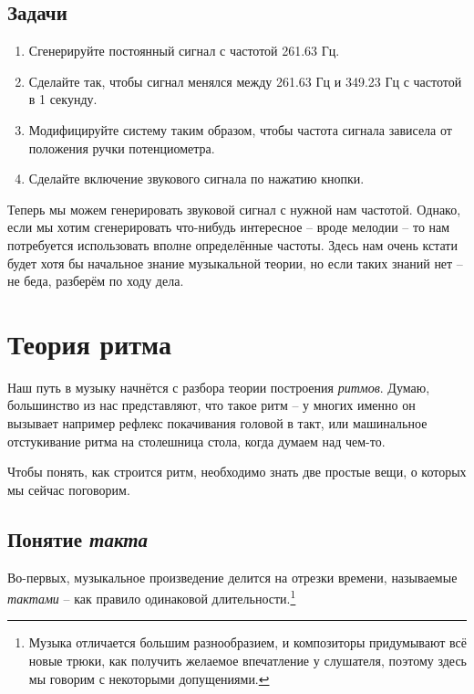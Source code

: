 \documentclass[a4paper,twoside]{book}
\begin{document}
\subsection{Задачи}
\begin{enumerate}
\item Сгенерируйте постоянный сигнал с частотой 261.63 Гц.
\item Сделайте так, чтобы сигнал менялся между 261.63 Гц и 349.23 Гц с частотой
  в 1 секунду. 
\item Модифицируйте систему таким образом, чтобы частота сигнала зависела от
  положения ручки потенциометра. 
\item Сделайте включение звукового сигнала по нажатию кнопки.
\end{enumerate}

Теперь мы можем генерировать звуковой сигнал с нужной нам частотой. Однако, если
мы хотим сгенерировать что-нибудь интересное -- вроде мелодии -- то нам
потребуется использовать вполне определённые частоты. Здесь нам очень кстати
будет хотя бы начальное знание музыкальной теории, но если таких знаний нет --
не беда, разберём по ходу дела.

\section{Теория ритма}

Наш путь в музыку начнётся с разбора теории построения \emph{ритмов}. Думаю,
большинство из нас представляют, что такое ритм -- у многих именно он вызывает
например рефлекс покачивания головой в такт, или машинальное отстукивание ритма
на столешница стола, когда думаем над чем-то.

Чтобы понять, как строится ритм, необходимо знать две простые вещи, о которых мы
сейчас поговорим.

\subsection{Понятие \emph{такта}}

Во-первых, музыкальное произведение делится на отрезки времени, называемые
\emph{тактами} -- как правило одинаковой длительности.\footnote{Музыка отличается
большим разнообразием, и композиторы придумывают всё новые трюки, как получить
желаемое впечатление у слушателя, поэтому здесь мы говорим с некоторыми
допущениями.}
\end{document}
